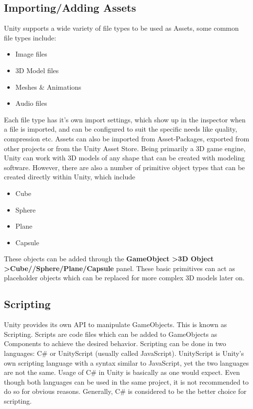 \subsection{Importing/Adding Assets}
Unity supports a wide variety of file types to be used as Assets, some common file types include:
\begin{itemize}
\item Image files
\item 3D Model files
\item Meshes \& Animations
\item Audio files
\end{itemize}
Each file type has it's own import settings, which show up in the inspector when a file is imported, and can be configured to suit the specific needs like quality, compression etc. Assets can also be imported from Asset-Packages, exported from other projects or from the Unity Asset Store. Being primarily a 3D game engine, Unity can work with 3D models of any shape that can be created with modeling software. However, there are also a number of primitive object types that can be created directly within Unity, which include 
\begin{itemize}
\item Cube
\item Sphere
\item Plane
\item Capsule
\end{itemize}
These objects can be added through the \textbf{GameObject \textgreater 3D Object \textgreater Cube/\newline/Sphere/Plane/Capsule} panel. These basic primitives can act as placeholder objects which can be replaced for more complex 3D models later on.

\subsection{Scripting}
Unity provides its own API to manipulate GameObjects. This is known as Scripting. Scripts are code files which can be added to GameObjects as Components to achieve the desired behavior. Scripting can be done in two languages: C\# or UnityScript (usually called JavaScript). UnityScript is Unity's own scripting language with a syntax similar to JavaScript, yet the two languages are not the same. Usage of C\# in Unity is basically as one would expect. Even though both languages can be used in the same project, it is not recommended to do so for obvious reasons. Generally, C\# is considered to be the better choice for scripting.

